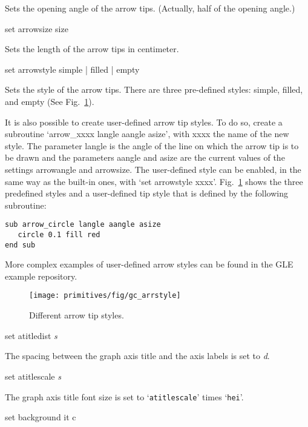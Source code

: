 \begin{commanddescription}
Sets the opening angle of the arrow tips. (Actually, half of the opening angle.)

\item[{\sf set arrowsize {\sf size}}]

Sets the length of the arrow tips in centimeter.

\item[{\sf set arrowstyle {\sf simple | filled | empty}}]

Sets the style of the arrow tips. There are three pre-defined styles: simple, filled, and empty (See Fig.~\ref{arrsty:fig}).

It is also possible to create user-defined arrow tip styles. To do so, create a subroutine `{\sf arrow\_xxxx langle aangle asize}', with {\sf xxxx} the name of the new style. The parameter {\sf langle} is the angle of the line on which the arrow tip is to be drawn and the parameters {\sf aangle} and {\sf asize} are the current values of the settings {\sf arrowangle} and {\sf arrowsize}. The user-defined style can be enabled, in the same way as the built-in ones, with `{\sf set arrowstyle xxxx}'. Fig.~\ref{arrsty:fig} shows the three predefined styles and a user-defined tip style that is defined by the following subroutine:

\begin{Verbatim}
sub arrow_circle langle aangle asize
   circle 0.1 fill red
end sub
\end{Verbatim}

\noindent{}More complex examples of user-defined arrow styles can be found in the GLE example repository.

\begin{figure}
\centering
\texttt{[image: primitives/fig/gc\_arrstyle]}
\caption{\label{arrsty:fig}Different arrow tip styles.}
\end{figure}

\item[{\sf set atitledist {\it s}}]

The spacing between the graph axis title and the axis labels is set to {\it d}.

\item[{\sf set atitlescale {\it s}}]

The graph axis title font size is set to `\texttt{atitlescale}' times `\texttt{hei}'.

\item[{\sf set background {it c}}]


\end{commanddescription}
